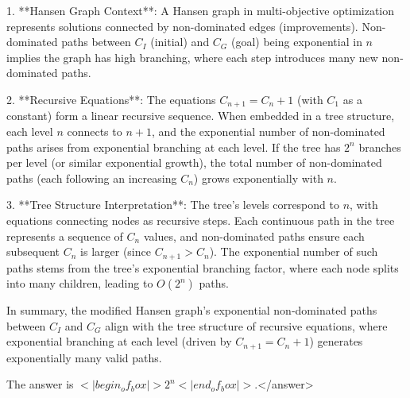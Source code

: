 1. **Hansen Graph Context**: A Hansen graph in multi-objective optimization represents solutions connected by non-dominated edges (improvements). Non-dominated paths between \( C_I \) (initial) and \( C_G \) (goal) being exponential in \( n \) implies the graph has high branching, where each step introduces many new non-dominated paths.  

2. **Recursive Equations**: The equations \( C_{n+1} = C_n + 1 \) (with \( C_1 \) as a constant) form a linear recursive sequence. When embedded in a tree structure, each level \( n \) connects to \( n+1 \), and the exponential number of non-dominated paths arises from exponential branching at each level. If the tree has \( 2^n \) branches per level (or similar exponential growth), the total number of non-dominated paths (each following an increasing \( C_n \)) grows exponentially with \( n \).  

3. **Tree Structure Interpretation**: The tree’s levels correspond to \( n \), with equations connecting nodes as recursive steps. Each continuous path in the tree represents a sequence of \( C_n \) values, and non-dominated paths ensure each subsequent \( C_n \) is larger (since \( C_{n+1} > C_n \)). The exponential number of such paths stems from the tree’s exponential branching factor, where each node splits into many children, leading to \( O(2^n) \) paths.  

In summary, the modified Hansen graph’s exponential non-dominated paths between \( C_I \) and \( C_G \) align with the tree structure of recursive equations, where exponential branching at each level (driven by \( C_{n+1} = C_n + 1 \)) generates exponentially many valid paths.  

The answer is \(<|begin_of_box|>2^n<|end_of_box|>\).</answer>